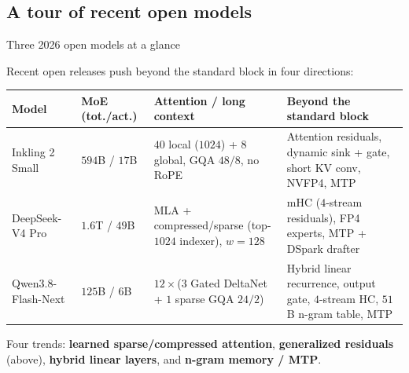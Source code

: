 \documentclass[11pt,aspectratio=169]{beamer}
\begin{document}
\subsection{A tour of recent open models}

\begin{frame}{Three 2026 open models at a glance}
    \setlength{\parskip}{3pt}

    {\small Recent open releases push beyond the standard block in four directions:}

    \centering
    \renewcommand{\arraystretch}{1.15}
    {\scriptsize
    \begin{tabular}{@{}p{}p{}p{}p{}@{}}
        \textbf{Model} & \textbf{MoE (tot./act.)} & \textbf{Attention / long context} & \textbf{Beyond the standard block} \\
        \hline
        Inkling 2 Small & $594$B / $17$B & $40$ local ($1024$) + $8$ global, GQA $48/8$, no RoPE & Attention residuals, dynamic sink + gate, short KV conv, NVFP4, MTP \\
        DeepSeek-V4 Pro & $1.6$T / $49$B & MLA + compressed/sparse (top-$1024$ indexer), $w=128$ & mHC ($4$-stream residuals), FP4 experts, MTP + DSpark drafter \\
        Qwen3.8-Flash-Next & $125$B / $6$B & $12\times$($3$ Gated DeltaNet + $1$ sparse GQA $24/2$) & Hybrid linear recurrence, output gate, $4$-stream HC, $51$B n-gram table, MTP \\
    \end{tabular}}
    \par\vspace{0.35em}
    \centering
    
    \par\vspace{-0.3em}
    \justifying
    {\scriptsize Four trends: \textbf{learned sparse/compressed attention}, \textbf{generalized residuals} (above), \textbf{hybrid linear layers}, and \textbf{n-gram memory / MTP}.}

\end{frame}
\end{document}
